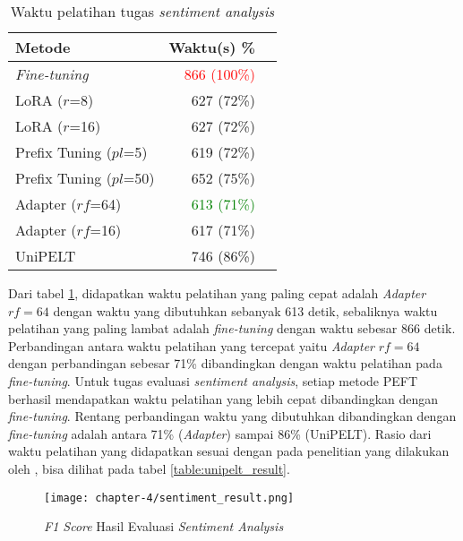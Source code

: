 \begin{table}[h]
    \centering
    \caption{Waktu pelatihan tugas \textit{sentiment analysis}}
    \label{table:runtime-sentiment}
    \begin{tabular}{l|rr}
        \toprule
        \textbf{Metode} & \textbf{Waktu(s) \%} \\
        \midrule
        \textit{Fine-tuning} & \textcolor{Red}{866 (100\%)} \\
        LoRA ($r$=8) & 627 (72\%) \\
        LoRA ($r$=16) & 627 (72\%) \\
        Prefix Tuning ($pl$=5) & 619 (72\%) \\
        Prefix Tuning ($pl$=50) & 652 (75\%) \\
        Adapter ($rf$=64) & \textcolor{Green}{613 (71\%)} \\
        Adapter ($rf$=16) & 617 (71\%) \\
        UniPELT & 746 (86\%) \\
        \bottomrule
    \end{tabular}
\end{table}

Dari tabel \ref{table:runtime-sentiment}, didapatkan waktu pelatihan yang paling cepat adalah \textit{Adapter} $rf=64$ dengan waktu yang dibutuhkan sebanyak 613 detik, sebaliknya waktu pelatihan yang paling lambat adalah \textit{fine-tuning} dengan waktu sebesar 866 detik. Perbandingan antara waktu pelatihan yang tercepat yaitu \textit{Adapter} $rf=64$ dengan perbandingan sebesar 71\% dibandingkan dengan waktu pelatihan pada \textit{fine-tuning}. Untuk tugas evaluasi \textit{sentiment analysis}, setiap metode PEFT berhasil mendapatkan waktu pelatihan yang lebih cepat dibandingkan dengan \textit{fine-tuning}. Rentang perbandingan waktu yang dibutuhkan dibandingkan dengan \textit{fine-tuning} adalah antara 71\% (\textit{Adapter}) sampai 86\% (UniPELT). Rasio dari waktu pelatihan yang didapatkan sesuai dengan pada penelitian yang dilakukan oleh \citeauthor{unipelt}, bisa dilihat pada tabel \ref{table:unipelt_result}.

\begin{figure}[h]
    \centering
    \centerline{\texttt{[image: chapter-4/sentiment\_result.png]}}
    \caption{\textit{F1 Score} Hasil Evaluasi \textit{Sentiment Analysis}}
    \label{fig:sentiment-result}
\end{figure}

